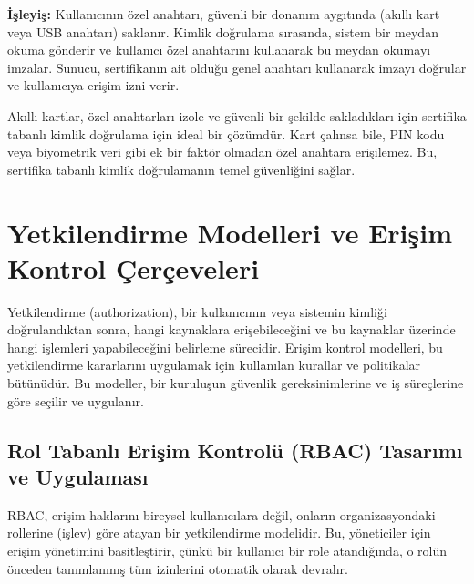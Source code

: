 \textbf{İşleyiş:} Kullanıcının özel anahtarı, güvenli bir donanım aygıtında (akıllı kart veya USB anahtarı) saklanır. Kimlik doğrulama sırasında, sistem bir meydan okuma gönderir ve kullanıcı özel anahtarını kullanarak bu meydan okumayı imzalar. Sunucu, sertifikanın ait olduğu genel anahtarı kullanarak imzayı doğrular ve kullanıcıya erişim izni verir.

Akıllı kartlar, özel anahtarları izole ve güvenli bir şekilde sakladıkları için sertifika tabanlı kimlik doğrulama için ideal bir çözümdür. Kart çalınsa bile, PIN kodu veya biyometrik veri gibi ek bir faktör olmadan özel anahtara erişilemez. Bu, sertifika tabanlı kimlik doğrulamanın temel güvenliğini sağlar.

\section{Yetkilendirme Modelleri ve Erişim Kontrol Çerçeveleri}
Yetkilendirme (authorization), bir kullanıcının veya sistemin kimliği doğrulandıktan sonra, hangi kaynaklara erişebileceğini ve bu kaynaklar üzerinde hangi işlemleri yapabileceğini belirleme sürecidir. Erişim kontrol modelleri, bu yetkilendirme kararlarını uygulamak için kullanılan kurallar ve politikalar bütünüdür. Bu modeller, bir kuruluşun güvenlik gereksinimlerine ve iş süreçlerine göre seçilir ve uygulanır.

\subsection{Rol Tabanlı Erişim Kontrolü (RBAC) Tasarımı ve Uygulaması}

RBAC, erişim haklarını bireysel kullanıcılara değil, onların organizasyondaki rollerine (işlev) göre atayan bir yetkilendirme modelidir. Bu, yöneticiler için erişim yönetimini basitleştirir, çünkü bir kullanıcı bir role atandığında, o rolün önceden tanımlanmış tüm izinlerini otomatik olarak devralır.

